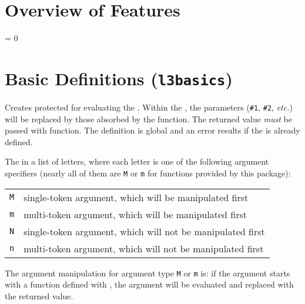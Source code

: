 \documentclass[oneside]{book}
\begin{document}
\chapter{Overview of Features}

\ExplSyntaxOn

\PrgNewFunction {}
  {
    \IntSet {}
    \Result { \IntUse \lTmpaInt }
  }

\PrgNewFunction {}
  {
    \IntSet {}
    \Result { \Value \lTmpaInt }
  }

\PrgNewFunction {}
  {
     = { 0 }
      {  }
      {
        \TlSet \lTmpaTl
          {
             {  }
          }
        \Result { \Value \lTmpaTl }
      }
  }

\ExplSyntaxOff




\chapter{Basic Definitions (\texttt{l3basics})}

\begin{function}{\PrgNewFunction}
\begin{syntax}
   
\end{syntax}
Creates protected  for evaluating the .
Within the , the parameters (\verb|#1|, \verb|#2|,
\emph{etc.}) will be replaced by those absorbed by the function.
The returned value \emph{must} be passed with  function.
The definition is global and an error results if the
 is already defined.\par
The  in a list of letters,
where each letter is one of the following argument specifiers
(nearly all of them are \texttt{M} or \texttt{m} for functions provided by this package):\par
{\centering\begin{tabular}{ll}
  \texttt{M} & single-token argument, which will be manipulated first \\
  \texttt{m} & multi-token argument, which will be manipulated first \\
  \texttt{N} & single-token argument, which will not be manipulated first \\
  \texttt{n} & multi-token argument, which will not be manipulated first \\
\end{tabular}\par}
The argument manipulation for argument type \texttt{M} or \texttt{m}
is: if the argument starts with a function defined with ,
the argument will be evaluated and replaced with the returned value.
\end{function}
\end{document}
